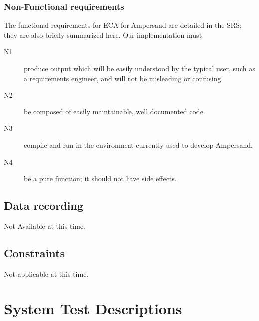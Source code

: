 \documentclass[12pt]{report}
\begin{document}
\subsection{Non-Functional requirements}\label{subsec:NonFunReqs}
The functional requirements for ECA for Ampersand are detailed in the SRS; they
are also briefly summarized here. Our implementation must

\begin{description}
\item[N1] produce output which will be easily understood by the typical user,
  such as a requirements engineer, and will not be misleading or confusing.  
\item[N2] be composed of easily maintainable, well documented code.
\item[N3] compile and run in the environment currently used to develop
  Ampersand.
\item[N4] be a pure function; it should not have side effects.  
\end{description}

\section{Data recording}\label{sec:DataRec}
Not Available at this time.
\section{Constraints}\label{sec:Constraints}
Not applicable at this time.

\chapter{System Test Descriptions}\label{ch:SystemTests}
\newcommand{\us}{\textunderscore}
\newcommand{\tabb}{\hspace{35pt}}
\setcounter{sysTestNum}{1}

\newcommand{\ECAIns}[2]{\mathbf{Ins}(#1,#2)}
\newcommand{\ECADel}[2]{\mathbf{Del}(#1,#2)}
\newcommand{\ECAInsDel}[2]{\mathbf{\{Ins/Del\}}(#1,#2)}
\newcommand{\ECADelIns}[2]{\mathbf{\{Del/Ins\}}(#1,#2)}
\newcommand{\ECAOn}{\mathbf{On~}}
\newcommand{\ECADo}{\ECASpacer\mathbf{Do~}}
\newcommand{\ECANop}{\mathbf{Nop~}}
\newcommand{\ECASpacer}{\,\,\,\,}
\newcommand{\IRel}[1]{\mathbb{I}_{#1}}
\newcommand{\VRel}[2]{\mathbb{V}_{#1\times#2}}
\end{document}
